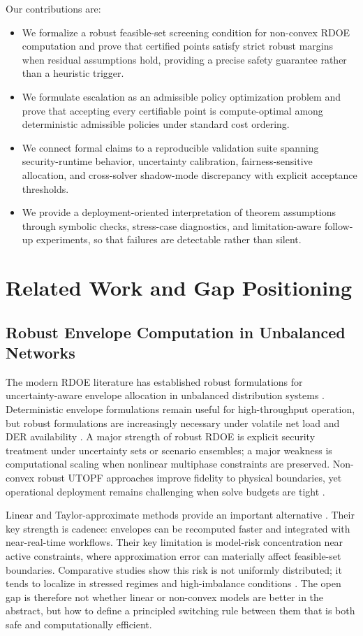 \documentclass{article} %
\begin{document}
Our contributions are:
\begin{itemize}
\item We formalize a robust feasible-set screening condition for non-convex RDOE computation and prove that certified points satisfy strict robust margins when residual assumptions hold, providing a precise safety guarantee rather than a heuristic trigger.
\item We formulate escalation as an admissible policy optimization problem and prove that accepting every certifiable point is compute-optimal among deterministic admissible policies under standard cost ordering.
\item We connect formal claims to a reproducible validation suite spanning security-runtime behavior, uncertainty calibration, fairness-sensitive allocation, and cross-solver shadow-mode discrepancy with explicit acceptance thresholds.
\item We provide a deployment-oriented interpretation of theorem assumptions through symbolic checks, stress-case diagnostics, and limitation-aware follow-up experiments, so that failures are detectable rather than silent.
\end{itemize}

\section{Related Work and Gap Positioning}
\subsection{Robust Envelope Computation in Unbalanced Networks}
The modern RDOE literature has established robust formulations for uncertainty-aware envelope allocation in unbalanced distribution systems \citep{KA01,KA03}. Deterministic envelope formulations remain useful for high-throughput operation, but robust formulations are increasingly necessary under volatile net load and DER availability \citep{KA15,KA35}. A major strength of robust RDOE is explicit security treatment under uncertainty sets or scenario ensembles; a major weakness is computational scaling when nonlinear multiphase constraints are preserved. Non-convex robust UTOPF approaches improve fidelity to physical boundaries, yet operational deployment remains challenging when solve budgets are tight \citep{KA01,KA05}.

Linear and Taylor-approximate methods provide an important alternative \citep{KA02,KA22}. Their key strength is cadence: envelopes can be recomputed faster and integrated with near-real-time workflows. Their key limitation is model-risk concentration near active constraints, where approximation error can materially affect feasible-set boundaries. Comparative studies show this risk is not uniformly distributed; it tends to localize in stressed regimes and high-imbalance conditions \citep{KA05}. The open gap is therefore not whether linear or non-convex models are better in the abstract, but how to define a principled switching rule between them that is both safe and computationally efficient.
\end{document}
